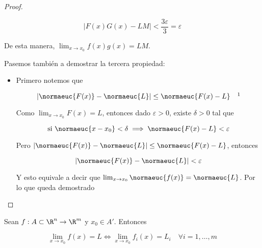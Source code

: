 \begin{proof}
\begin{itemize}
        \[
        \left| F(x)G(x) - LM \right| < \frac{3 \varepsilon}{3} = \varepsilon
        \]
        
        De esta manera, $\lim_{x \to x_0} f(x)g(x) = LM$.
    \end{itemize}
    
    Pasemos también a demostrar la tercera propiedad:
    
    \begin{itemize}
        \item Primero notemos que
        
        \[
        \left| \normaeuc{F(x)} - \normaeuc{L} \right| \leq \normaeuc{F(x) - L} \quad \footnotemark
        \]
        
        Como $\lim_{x \to x_0} F(x) = L$, entonces dado $\varepsilon > 0$, existe $\delta > 0$ tal que
        
        \[
        \text{si $\normaeuc{x - x_0} < \delta$} \implies \normaeuc{F(x) - L} < \varepsilon
        \]
        
        Pero $\left| \normaeuc{F(x)} - \normaeuc{L} \right| \leq \normaeuc{F(x) - L}$, entonces
        
        \[
        \left| \normaeuc{F(x)} - \normaeuc{L} \right| < \varepsilon
        \]
        
        Y esto equivale a decir que $\lim_{x \to x_0} \normaeuc{f(x)} = \normaeuc{L}$. Por lo que queda demostrado
    \end{itemize}
\end{proof}

\begin{teo}
    Sean $f: A \subset \R^n \rightarrow \R^m$ y $x_0 \in A'$. Entonces
    
    \[
    \lim_{x \to x_0} f(x) = L \iff \lim_{x \to x_0} f_i(x) = L_i \quad \forall i = 1, \dots, m
    \]
\end{teo}

